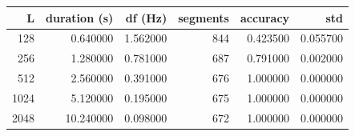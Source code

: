 \begin{tabular}{rrrrrr}
\toprule
L & duration (s) & df (Hz) & segments & accuracy & std \\
\midrule
128 & 0.640000 & 1.562000 & 844 & 0.423500 & 0.055700 \\
256 & 1.280000 & 0.781000 & 687 & 0.791000 & 0.002000 \\
512 & 2.560000 & 0.391000 & 676 & 1.000000 & 0.000000 \\
1024 & 5.120000 & 0.195000 & 675 & 1.000000 & 0.000000 \\
2048 & 10.240000 & 0.098000 & 672 & 1.000000 & 0.000000 \\
\bottomrule
\end{tabular}
